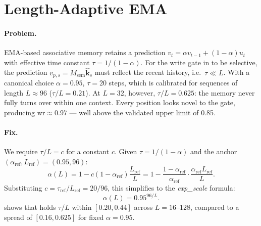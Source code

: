 \documentclass{article}
\newcommand{\Msem}{M_{\mathrm{sem}}}
\newcommand{\ksnorm}{\hat{\mathbf{k}}_s}
\newcommand{\vps}{v_{p,s}}
\begin{document}
\section{Length-Adaptive EMA}
\label{sec:ema}

\paragraph{Problem.}
EMA-based associative memory retains a prediction $v_t = \alpha v_{t-1} + (1-\alpha)u_t$
with effective time constant $\tau = 1/(1-\alpha)$.  For the write gate in
 to be selective, the prediction $\vps = \Msem\ksnorm$ must reflect the
recent history, i.e.\ $\tau \ll L$.  With a canonical choice $\alpha = 0.95$,
$\tau = 20$ steps, which is calibrated for sequences of length $L \approx 96$
($\tau/L = 0.21$).  At $L=32$, however, $\tau/L = 0.625$: the memory never fully
turns over within one context.  Every position looks novel to the gate, producing
$\mathrm{wr} \approx 0.97$ — well above the validated upper limit of 0.85.

\paragraph{Fix.}
We require $\tau/L = c$ for a constant $c$.  Given $\tau = 1/(1-\alpha)$ and the
anchor $(\alpha_{\mathrm{ref}}, L_{\mathrm{ref}}) = (0.95, 96)$:
\begin{equation}
  \alpha(L) = 1 - c(1 - \alpha_{\mathrm{ref}})\frac{L_{\mathrm{ref}}}{L}
            = 1 - \frac{1-\alpha_{\mathrm{ref}}}{\alpha_{\mathrm{ref}}} \cdot
              \frac{\alpha_{\mathrm{ref}} L_{\mathrm{ref}}}{L}.
\end{equation}
Substituting $c = \tau_{\mathrm{ref}}/L_{\mathrm{ref}} = 20/96$, this simplifies to
the \emph{exp\_scale} formula:
\begin{equation}
  \alpha(L) = 0.95^{96/L}.
  \label{eq:exp-scale}
\end{equation}
 shows that  holds $\tau/L$ within $[0.20, 0.44]$
across $L=16$--$128$, compared to a spread of $[0.16, 0.625]$ for fixed $\alpha=0.95$.
\end{document}
